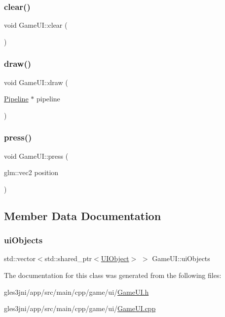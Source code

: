 \mbox{\label{class_game_u_i_aa2faeb231df86a0833f37ca01d1119d8}} 
\subsubsection{\texorpdfstring{clear()}{clear()}}
{\footnotesize\ttfamily void Game\+U\+I\+::clear (\begin{DoxyParamCaption}{ }\end{DoxyParamCaption})}

\mbox{\label{class_game_u_i_a850141c08b7136a4270055b7d45a8317}} 
\subsubsection{\texorpdfstring{draw()}{draw()}}
{\footnotesize\ttfamily void Game\+U\+I\+::draw (\begin{DoxyParamCaption}\item[{\hyperlink{class_pipeline}{Pipeline} $\ast$}]{pipeline }\end{DoxyParamCaption})}

\mbox{\label{class_game_u_i_a7095c2f36bf6a6529a7cd8e72e8edfe2}} 
\subsubsection{\texorpdfstring{press()}{press()}}
{\footnotesize\ttfamily void Game\+U\+I\+::press (\begin{DoxyParamCaption}\item[{glm\+::vec2}]{position }\end{DoxyParamCaption})}



\subsection{Member Data Documentation}
\mbox{\label{class_game_u_i_abbf214394815b03afd579435f784b7f3}} 
\subsubsection{\texorpdfstring{ui\+Objects}{uiObjects}}
{\footnotesize\ttfamily std\+::vector$<$std\+::shared\+\_\+ptr$<$\hyperlink{class_u_i_object}{U\+I\+Object}$>$ $>$ Game\+U\+I\+::ui\+Objects\hspace{0.3cm}{\ttfamily [private]}}



The documentation for this class was generated from the following files\+:\begin{DoxyCompactItemize}
\item 
gles3jni/app/src/main/cpp/game/ui/\hyperlink{_game_u_i_8h}{Game\+U\+I.\+h}\item 
gles3jni/app/src/main/cpp/game/ui/\hyperlink{_game_u_i_8cpp}{Game\+U\+I.\+cpp}\end{DoxyCompactItemize}

